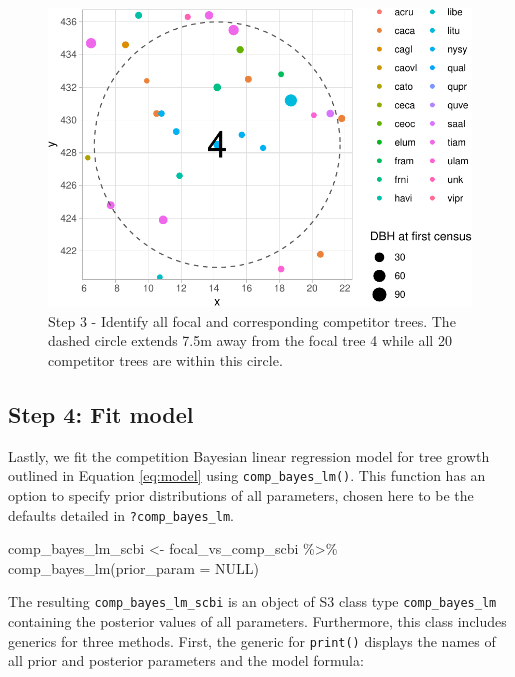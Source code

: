\documentclass[12pt]{article}
\newenvironment{Shaded}{\begin{snugshade}}{\end{snugshade}}
\newcommand{\AttributeTok}[1]{\textcolor[rgb]{0.77,0.63,0.00}{#1}}
\newcommand{\ConstantTok}[1]{\textcolor[rgb]{0.00,0.00,0.00}{#1}}
\newcommand{\FunctionTok}[1]{\textcolor[rgb]{0.00,0.00,0.00}{#1}}
\newcommand{\NormalTok}[1]{#1}
\newcommand{\OtherTok}[1]{\textcolor[rgb]{0.56,0.35,0.01}{#1}}
\newcommand{\SpecialCharTok}[1]{\textcolor[rgb]{0.00,0.00,0.00}{#1}}
\begin{document}
\begin{figure}

{\centering \includegraphics[width=0.66\linewidth]{Figures/scbi-focal-vs-comp-map-1} 

}

\caption{Step 3 - Identify all focal and corresponding competitor trees. The dashed circle extends 7.5m away from the focal tree 4 while all 20 competitor trees are within this circle.}\label{fig:scbi-focal-vs-comp-map}
\end{figure}

\hypertarget{model-fit-predict}{%
\subsection{Step 4: Fit model}\label{model-fit-predict}}

Lastly, we fit the competition Bayesian linear regression model for tree
growth outlined in Equation \ref{eq:model} using
\texttt{comp\_bayes\_lm()}. This function has an option to specify prior
distributions of all parameters, chosen here to be the defaults detailed
in \texttt{?comp\_bayes\_lm}.

\begin{Shaded}
\begin{Highlighting}[]
\NormalTok{comp\_bayes\_lm\_scbi }\OtherTok{\textless{}{-}}\NormalTok{ focal\_vs\_comp\_scbi }\SpecialCharTok{\%\textgreater{}\%}
    \FunctionTok{comp\_bayes\_lm}\NormalTok{(}\AttributeTok{prior\_param =} \ConstantTok{NULL}\NormalTok{)}
\end{Highlighting}
\end{Shaded}

The resulting \texttt{comp\_bayes\_lm\_scbi} is an object of S3 class
type \texttt{comp\_bayes\_lm} containing the posterior values of all
parameters. Furthermore, this class includes generics for three methods.
First, the generic for \texttt{print()} displays the names of all prior
and posterior parameters and the model formula:
\end{document}

